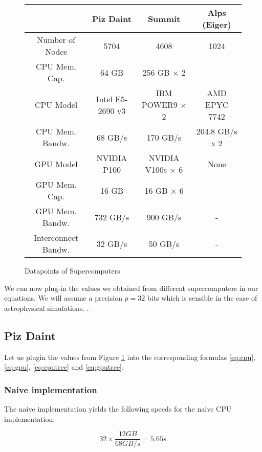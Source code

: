 \documentclass[]{article}
\begin{document}
\small
\begin{figure}[H]
	\begin{center}
		\begin{tabular}{ c c c c }
			& Piz Daint \cite{piz_daint} & Summit & Alps (Eiger) \\ 
			\hline
			Number of Nodes & 5704 & 4608 & 1024\\
			CPU Mem. Cap. & 64 GB & 256 GB $\times$ 2  \\   
			CPU Model & Intel E5-2690 v3 & IBM POWER9 $\times$ 2 & AMD EPYC 7742 \\
			CPU Mem. Bandw.  & 68 GB/s & 170 GB/s & 204.8 GB/s x 2	\\
			GPU Model & NVIDIA P100 & NVIDIA V100s  $\times$ 6 & None \\
			GPU Mem. Cap. & 16 GB & 16 GB $\times$ 6 & -\\
			GPU Mem. Bandw. & 732 GB/s & 900 GB/s & -\\
			Interconnect Bandw. & 32 GB/s & 50 GB/s & -\\
		\end{tabular}
	\end{center}
\caption{Datapoints of Supercomputers}
\label{fig:datapoints}
\end{figure}

We can now plug-in the values we obtained from different supercomputers in our equations.  We will assume a precision $p = 32$ bits which is sensible in the case of astrophysical simulations. .

\normalfont
\subsection{Piz Daint} 

Let us plugin the values from Figure \ref{fig:datapoints} into the corresponding formulas \ref{eq:cpu}, \ref{eq:gpu}, \ref{eq:cputree} and \ref{eq:gputree}.

\subsubsection{Naive implementation}
The naive implementation yields the following speeds for the naive CPU  implementation:

\begin{center}
	\begin{equation}
		32 \times \frac{ 12 GB }{68 GB/s} = 5.65s
	\end{equation}
\end{center}
\end{document}
